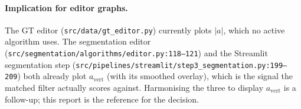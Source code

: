 \documentclass[11pt,a4paper]{article}
\newcommand{\avert}{a_{\mathrm{vert}}}
\newcommand{\amag}{\lvert a\rvert}
\begin{document}
\paragraph{Implication for editor graphs.}
The GT editor (\texttt{src/data/gt\_editor.py}) currently plots
$\amag$, which no active algorithm uses. The segmentation editor
(\texttt{src/segmentation/algorithms/editor.py:118--121}) and the
Streamlit segmentation step
(\texttt{src/pipelines/streamlit/step3\_segmentation.py:199--209})
both already plot $\avert$ (with its smoothed overlay), which is the
signal the matched filter actually scores against. Harmonising the
three to display $\avert$ is a follow-up; this report is the
reference for the decision.
\end{document}

